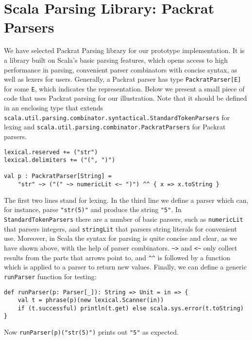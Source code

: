 \section{Scala Parsing Library: Packrat Parsers}\label{sec:packratparsers}

We have selected Packrat Parsing library for our prototype implementation. It is a library built on Scala's basic parsing features,
which opens access to high performance in parsing, convenient parser combinators with concise syntax, as well as lexers for users. Generally,
a Packrat parser has type \lstinline{PackratParser[E]} for some \lstinline{E}, which indicates the representation. Below we present a small piece of
code that uses Packrat parsing for our illustration. Note that it should be defined in an enclosing type that extends \lstinline{scala.util.parsing.combinator.syntactical.StandardTokenParsers} for lexing and \lstinline{scala.util.parsing.combinator.PackratParsers} for Packrat parsers.

\begin{lstlisting}
lexical.reserved += ("str")
lexical.delimiters += ("(", ")")

val p : PackratParser[String] =
    "str" ~> ("(" ~> numericLit <~ ")") ^^ { x => x.toString }
\end{lstlisting}

The first two lines stand for lexing. In the third line we define a parser which can, for instance, parse \lstinline{"str(5)"} and produce the string \lstinline{"5"}. In \lstinline{StandardTokenParsers} there are a number of basic parsers, such as \lstinline{numericLit} that parsers integers, and \lstinline{stringLit} that parsers string literals for convenient use. Moreover, in Scala the syntax for parsing is quite concise and clear, as we have shown above, with the help of parser combinators. \lstinline{~>} and \lstinline{<~} only collect results from the parts that arrows point to, and \lstinline{^^} is followed by a function which is applied to a parser to return new values. Finally, we can define a generic \lstinline{runParser} function for testing:

\begin{lstlisting}
def runParser(p: Parser[_]): String => Unit = in => {
    val t = phrase(p)(new lexical.Scanner(in))
    if (t.successful) println(t.get) else scala.sys.error(t.toString)
}
\end{lstlisting}
Now \lstinline{runParser(p)("str(5)")} prints out \lstinline{"5"} as expected.

